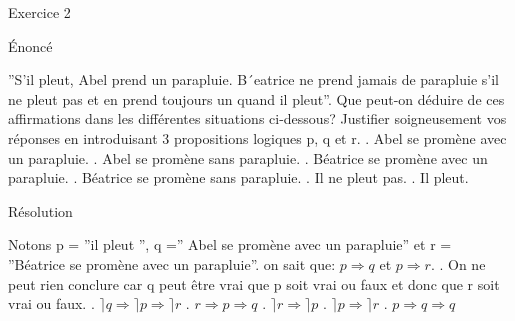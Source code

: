 \hypertarget{Exercice_2}{
\Huge{\begin{center}Exercice 2\end{center} \leavevmode\newline }}

\hypertarget{enonce}{%
\LARGE{Énoncé}\label{enonce}}
\newline
\newline
”S’il pleut, Abel prend un parapluie. B´eatrice ne prend jamais de parapluie s’il ne pleut pas et
en prend toujours un quand il pleut”. Que peut-on déduire de ces affirmations dans les différentes
situations ci-dessous? Justifier soigneusement vos réponses en introduisant 3 propositions logiques p, q
et r.
\newline
{}. Abel se promène avec un parapluie.
\newline
{}. Abel se promène sans parapluie.
\newline
{}. Béatrice se promène avec un parapluie.
\newline
{}. Béatrice se promène sans parapluie.
\newline
{}. Il ne pleut pas.
\newline
{}. Il pleut.
\newline
\newline

\hypertarget{resolution}{%
\LARGE{Résolution}\label{resolution}}
\newline
\newline
Notons p = ”il pleut ”, q =” Abel se promène avec un parapluie” et r = ”Béatrice se promène avec un parapluie”.
\newline
on sait que: $p\Rightarrow q$ et $p \Rightarrow r$.
\newline
{}. On ne peut rien conclure car q peut être vrai que p soit vrai ou faux et donc que r soit vrai ou faux.
\newline
{}. $\rceil q \Rightarrow \rceil p \Rightarrow \rceil r$
\newline
{}. $r \Rightarrow p \Rightarrow q$
\newline
{}. $\rceil r \Rightarrow \rceil p$
\newline
{}. $\rceil p \Rightarrow \rceil r$
\newline
{}. $p \Rightarrow q \Rightarrow q$
